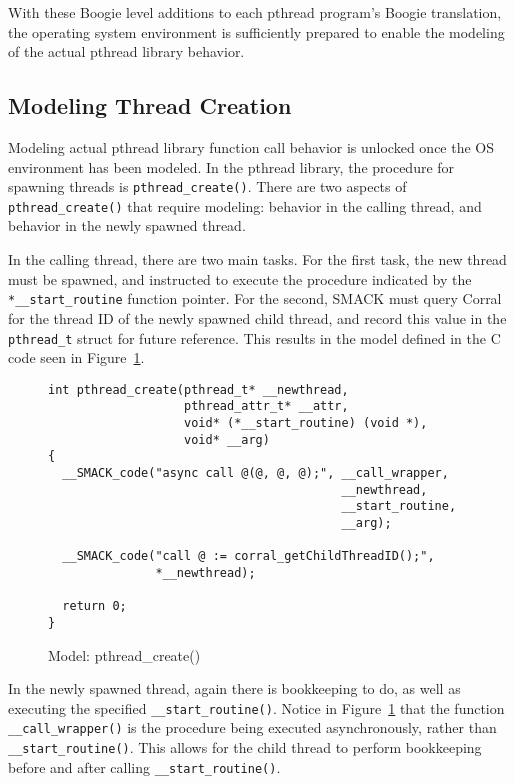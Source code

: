 With these Boogie level additions to each pthread program's Boogie
translation, the operating system environment is sufficiently prepared
to enable the modeling of the actual pthread library behavior.

\subsection{Modeling Thread Creation}
Modeling actual pthread library function call behavior is unlocked
once the OS environment has been modeled.  In the pthread library, the
procedure for spawning threads is \lstinline|pthread_create()|.  There
are two aspects of \lstinline|pthread_create()| that require modeling:
behavior in the calling thread, and behavior in the newly spawned
thread.

In the calling thread, there are two main tasks.  For the first task,
the new thread must be spawned, and instructed to execute the
procedure indicated by the \lstinline|*__start_routine| function
pointer.  For the second, SMACK must query Corral for the thread ID of
the newly spawned child thread, and record this value in the
\lstinline|pthread_t| struct for future reference.  This results in
the model defined in the C code seen in Figure~\ref{fig:pthread_create}.

\begin{figure}[h]
\centering
\caption{Model: pthread\_create()}\label{fig:pthread_create}
\begin{lstlisting}
int pthread_create(pthread_t* __newthread,
                   pthread_attr_t* __attr,
                   void* (*__start_routine) (void *),
                   void* __arg)
{
  __SMACK_code("async call @(@, @, @);", __call_wrapper,
                                         __newthread,
                                         __start_routine,
                                         __arg);

  __SMACK_code("call @ := corral_getChildThreadID();",
               *__newthread);

  return 0;
}
\end{lstlisting}
\end{figure}

In the newly spawned thread, again there is bookkeeping to do, as well
as executing the specified \lstinline|__start_routine()|.  Notice in
Figure~\ref{fig:pthread_create} that the function
\lstinline|__call_wrapper()| is the procedure being executed
asynchronously, rather than \lstinline|__start_routine()|.  This
allows for the child thread to perform bookkeeping before and after
calling \lstinline|__start_routine()|.

